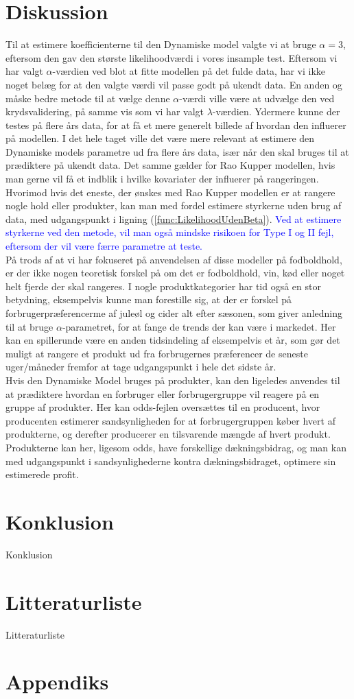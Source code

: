 \documentclass[11pt,a4paper]{article}
\begin{document}
\clearpage
\section{Diskussion}
Til at estimere koefficienterne til den Dynamiske model valgte vi at bruge $\alpha=3$, eftersom den gav den største likelihoodværdi i vores insample test. Eftersom vi har valgt $\alpha$-værdien ved blot at fitte modellen på det fulde data, har vi ikke noget belæg for at den valgte værdi vil passe godt på ukendt data. En anden og måske bedre metode til at vælge denne $\alpha$-værdi ville være at udvælge den ved krydsvalidering, på samme vis som vi har valgt $\lambda$-værdien. Ydermere kunne der testes på flere års data, for at få et mere generelt billede af hvordan den influerer på modellen. I det hele taget ville det være mere relevant at estimere den Dynamiske models parametre ud fra flere års data, især når den skal bruges til at prædiktere på ukendt data. Det samme gælder for Rao Kupper modellen, hvis man gerne vil få et indblik i hvilke kovariater der influerer på rangeringen. Hvorimod hvis det eneste, der ønskes med Rao Kupper modellen er at rangere nogle hold eller produkter, kan man med fordel estimere styrkerne uden brug af data, med udgangspunkt i ligning (\ref{func:LikelihoodUdenBeta}). \textcolor{blue}{Ved at estimere styrkerne ved den metode, vil man også mindske risikoen for Type I og II fejl, eftersom der vil være færre parametre at teste.} \\
På trods af at vi har fokuseret på anvendelsen af disse modeller på fodboldhold, er der ikke nogen teoretisk forskel på om det er fodboldhold, vin, kød eller noget helt fjerde der skal rangeres. I nogle produktkategorier har tid også en stor betydning, eksempelvis kunne man forestille sig, at der er forskel på forbrugerpræferencerme af juleøl og cider alt efter sæsonen, som giver anledning til at bruge $\alpha$-parametret, for at fange de trends der kan være i markedet. Her kan en spillerunde være en anden tidsindeling af eksempelvis et år, som gør det muligt at rangere et produkt ud fra forbrugernes præferencer de seneste uger/måneder fremfor at tage udgangspunkt i hele det sidste år. \\Hvis den Dynamiske Model bruges på produkter, kan den ligeledes anvendes til at prædiktere hvordan en forbruger eller forbrugergruppe vil reagere på en gruppe af produkter. Her kan odds-fejlen oversættes til en producent, hvor producenten estimerer sandsynligheden for at forbrugergruppen køber hvert af produkterne, og derefter producerer en tilsvarende mængde af hvert produkt. Produkterne kan her, ligesom odds, have forskellige dækningsbidrag, og man kan med udgangspunkt i sandsynlighederne kontra dækningsbidraget, optimere sin estimerede profit. 

\section{Konklusion}
Konklusion
\clearpage
\section{Litteraturliste}
Litteraturliste
\clearpage
\section{Appendiks}

\printbibliography %
\end{document}
